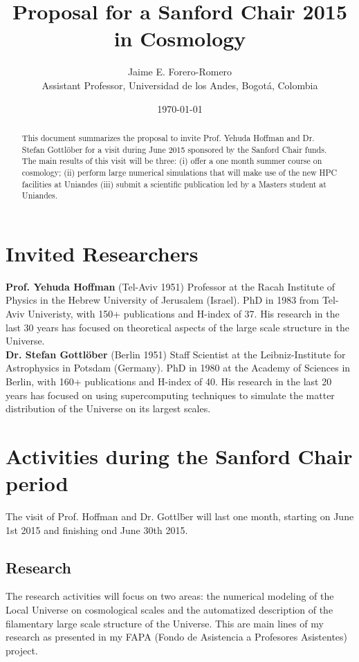 \documentclass[12pt]{article}
\title{Proposal for a Sanford Chair 2015 in Cosmology}
\author{Jaime E. Forero-Romero\\{\small Assistant Professor, Universidad de los Andes, Bogot\'a, Colombia}}
\date{\today}
\begin{document}
\maketitle

\begin{abstract}
This document summarizes the proposal to invite Prof. Yehuda Hoffman
and Dr. Stefan Gottl\"ober for a visit during June 2015 sponsored by the
Sanford Chair funds. The main results of this visit will be three: 
(i) offer a one month summer course on cosmology; (ii) perform large numerical
simulations that will make use of the new HPC facilities at Uniandes
(iii) submit a scientific publication led by a Masters student at
Uniandes.  
\end{abstract}


\section{Invited Researchers}


\noindent
{\bf Prof. Yehuda Hoffman} (Tel-Aviv 1951) Professor at the Racah
Institute of Physics in the Hebrew University of Jerusalem
(Israel). PhD in 1983 from Tel-Aviv Univeristy, with 150+ publications
and H-index of 37. His research in the last 30 years has focused on
theoretical aspects of the large scale structure in the Universe. \\

\noindent
{\bf Dr. Stefan Gottl\"ober} (Berlin 1951) Staff Scientist at the
Leibniz-Institute for Astrophysics in Potsdam (Germany). PhD in 1980
at the Academy of Sciences in Berlin, with 160+ publications and
H-index of 40. His research in the last 20 years has focused on using
supercomputing techniques  to simulate the matter distribution of the
Universe on its largest scales. 

\section{Activities during the Sanford Chair period}

The visit of Prof. Hoffman and Dr. Gottl\"ber will last one
month, starting on June 1st 2015 and finishing ond June 30th 2015. 

\subsection{Research}

The research activities will focus on two areas: the 
numerical modeling of the Local Universe on cosmological scales and
the automatized description of the filamentary large scale structure of the
Universe. This are main lines of my research as presented in my FAPA
(Fondo de Asistencia a Profesores Asistentes) project. 
\end{document}
